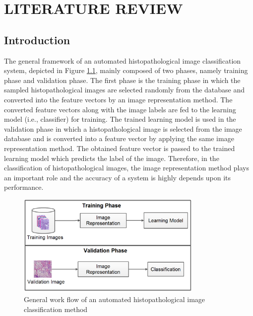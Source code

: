 

\chapter{LITERATURE REVIEW}\label{Ch2:Literature Review}
\graphicspath{{Chapter2/Chapter2Figs/}{Chapter2/Chapter2Figs/}}
\section{Introduction}
The general framework of an automated histopathological image classification system, depicted in  Figure \ref{ch1:fig:basic_model1}, mainly composed of two phases, namely  training phase and validation phase.  The first phase is the training phase in which the sampled histopathological images are selected randomly from the database and converted into the feature vectors by an image representation method. The converted feature vectors along with the image labels are fed to the learning model (i.e., classifier) for training. The trained learning model is used in the validation phase in which a histopathological image is selected from the image database and is converted into a feature vector by applying the same image representation method. The obtained feature vector is passed to the trained learning model which predicts the label of the image. Therefore, in the classification of histopathological images, the image representation method plays an important role and the accuracy of a system is highly depends upon its performance. 
\begin{figure}[h!]
\centering
     \includegraphics[width=0.8\textwidth]{basic_model1}
   \caption[General work flow of an automated histopathological image classification method]{\fontsize{10pt}{12pt}\selectfont General work flow of an automated histopathological image classification method}
 \label{ch1:fig:basic_model1}
\end{figure}
